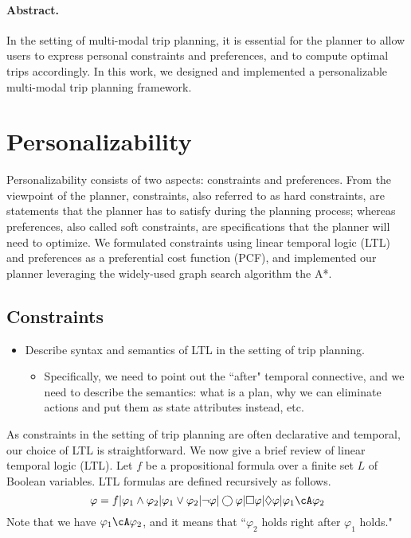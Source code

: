 \paragraph{\bf Abstract.}
In the setting of multi-modal trip planning, it is essential for
the planner to allow users to express personal constraints and preferences,
and to compute optimal trips accordingly.
In this work, we designed and implemented a personalizable multi-modal trip
planning framework.

\section{Personalizability}
Personalizability consists of two aspects: constraints and preferences.
From the viewpoint of the planner,
constraints, also referred to as hard constraints, are statements that the planner
has to satisfy during the planning process; whereas preferences, also called
soft constraints, are specifications that the planner will need to optimize.
We formulated constraints using linear temporal logic (LTL) and preferences as
a preferential cost function (PCF), and implemented our planner leveraging the
widely-used graph search algorithm the A*.

\subsection{Constraints}
\begin{itemize}
	\setlength\itemsep{1pt}
	\item Describe syntax and semantics of LTL in the setting of trip planning.
	\begin{itemize}
		\setlength\itemsep{0pt}
		\item Specifically, we need to point out the ``after" temporal connective,
					and we need to describe the semantics: what is a plan, why we can
					eliminate actions and put them as state attributes instead, etc.
	\end{itemize}
\end{itemize}
As constraints in the setting of trip planning are often declarative and
temporal, our choice of LTL is straightforward.
We now give a brief review of linear temporal logic (LTL).
Let $f$ be a propositional formula over a finite set $L$ of Boolean variables.  
LTL formulas are defined recursively as follows.
\begin{equation}
	\varphi = f | \varphi_1 \land \varphi_2 | \varphi_1 \lor \varphi_2 | \neg \varphi | 
		\bigcirc \varphi |	\Box \varphi | \Diamond \varphi | \varphi_1 \cA \varphi_2
\end{equation}
Note that we have $\varphi_1 \cA \varphi_2$, and it means that
``$\varphi_2$ holds right after $\varphi_1$ holds."

